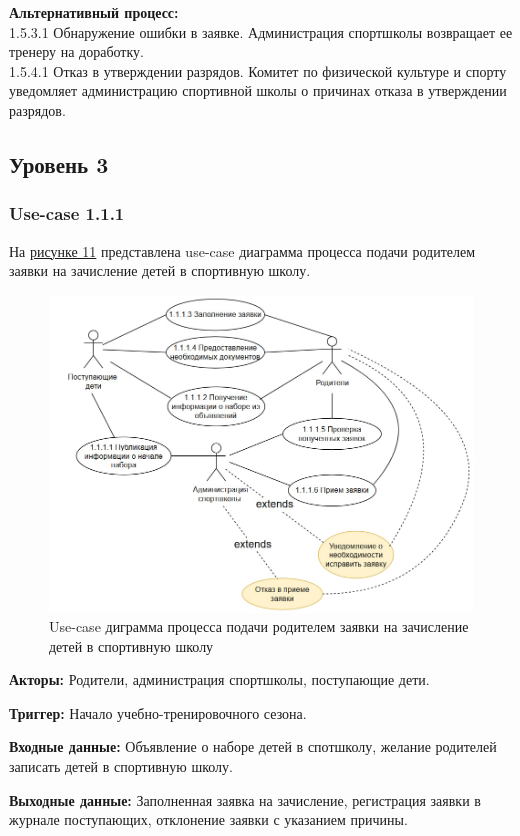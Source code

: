 \documentclass[12pt,a4paper,final]{article} %
\begin{document}
\par \textbf{Альтернативный процесс:} \\
1.5.3.1 Обнаружение ошибки в заявке. Администрация спортшколы возвращает ее тренеру на доработку. \\
1.5.4.1 Отказ в утверждении разрядов. Комитет по физической культуре и спорту уведомляет администрацию спортивной школы о причинах отказа в утверждении разрядов. 

\subsection{Уровень 3}
\subsubsection{Use-case 1.1.1}
\par На \hyperref[fig:im11]{рисунке 11} представлена use-case диаграмма процесса подачи родителем заявки на зачисление детей в спортивную школу.
\begin{figure}[h!]
	\hspace{- 1.55cm} 
	\centering
	\includegraphics[width=0.9\linewidth]{images/8}
	\caption{Use-case диграмма процесса подачи родителем заявки на зачисление детей в спортивную школу}
	\label{fig:im11}
\end{figure}	

\par \textbf{Акторы:} Родители, администрация спортшколы, поступающие дети.
\par \textbf{Триггер:} Начало учебно-тренировочного сезона.
\par \textbf{Входные данные:} Объявление о наборе детей в спотшколу, желание родителей записать детей в спортивную школу.
\par \textbf{Выходные данные:} Заполненная заявка на зачисление, регистрация заявки в журнале поступающих, отклонение заявки с указанием причины.
\end{document}
